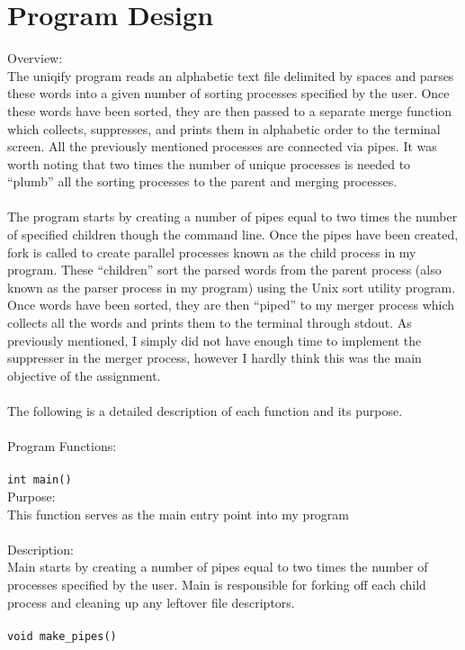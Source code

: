 \documentclass[12pt,letterpaper]{article}
\begin{document}
\section{Program Design}
{\large Overview:}
\\
The uniqify program reads an alphabetic text file delimited by spaces and parses these words into a given number of sorting processes specified by the user. Once these words have been sorted, they are then passed to a separate merge function which collects, suppresses, and prints them in alphabetic order to the terminal screen. All the previously mentioned processes are connected via pipes. It was worth noting that two times the number of unique processes is needed to “plumb” all the sorting processes to the parent and merging processes.
\\\\
The program starts by creating a number of pipes equal to two times the number of specified children though the command line. Once the pipes have been created, fork is called to create parallel processes known as the child process in my program. These “children” sort the parsed words from the parent process (also known as the parser process in my program) using the Unix sort utility program. Once words have been sorted, they are then “piped” to my merger process which collects all the words and prints them to the terminal through stdout. As previously mentioned, I simply did not have enough time to implement the suppresser in the merger process, however I hardly think this was the main objective of the assignment.
\\\\
The following is a detailed description of each function and its purpose.
\\\\
{\large Program Functions:}
\\\\
\texttt{int main()}
\\
Purpose:
\\
This function serves as the main entry point into my program
\\\\
Description:
\\
Main starts by creating a number of pipes equal to two times the number of processes specified by the user. Main is responsible for forking off each child process and cleaning up any leftover file descriptors. 
\\\\
\texttt{void make\_pipes()}
\\
\end{document}
